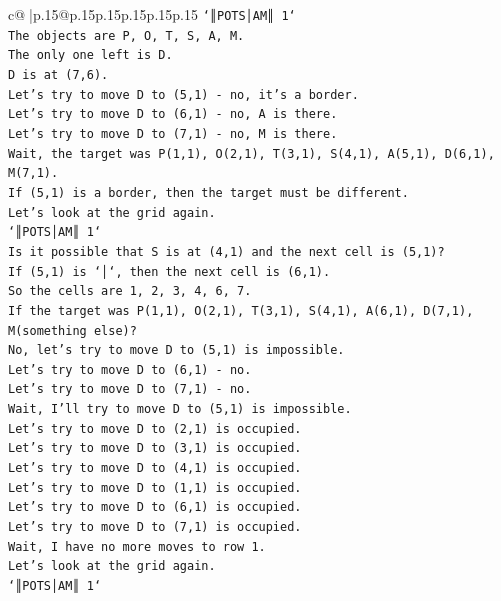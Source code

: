 \documentclass{article}
\begin{document}
{\begin{supertabular}{c@{$\;$}|p{.15\linewidth}@{}p{.15\linewidth}p{.15\linewidth}p{.15\linewidth}p{.15\linewidth}p{.15\linewidth}}
{{{\texttt{`║POTS│AM║ 1`} \\
\texttt{The objects are P, O, T, S, A, M.} \\
\texttt{The only one left is D.} \\
\texttt{D is at (7,6).} \\
\texttt{Let's try to move D to (5,1) {-} no, it's a border.} \\
\texttt{Let's try to move D to (6,1) {-} no, A is there.} \\
\texttt{Let's try to move D to (7,1) {-} no, M is there.} \\
\texttt{Wait, the target was P(1,1), O(2,1), T(3,1), S(4,1), A(5,1), D(6,1), M(7,1).} \\
\texttt{If (5,1) is a border, then the target must be different.} \\
\texttt{Let's look at the grid again.} \\
\texttt{`║POTS│AM║ 1`} \\
\texttt{Is it possible that S is at (4,1) and the next cell is (5,1)?} \\
\texttt{If (5,1) is `│`, then the next cell is (6,1).} \\
\texttt{So the cells are 1, 2, 3, 4, 6, 7.} \\
\texttt{If the target was P(1,1), O(2,1), T(3,1), S(4,1), A(6,1), D(7,1), M(something else)?} \\
\texttt{No, let's try to move D to (5,1) is impossible.} \\
\texttt{Let's try to move D to (6,1) {-} no.} \\
\texttt{Let's try to move D to (7,1) {-} no.} \\
\texttt{Wait, I'll try to move D to (5,1) is impossible.} \\
\texttt{Let's try to move D to (2,1) is occupied.} \\
\texttt{Let's try to move D to (3,1) is occupied.} \\
\texttt{Let's try to move D to (4,1) is occupied.} \\
\texttt{Let's try to move D to (1,1) is occupied.} \\
\texttt{Let's try to move D to (6,1) is occupied.} \\
\texttt{Let's try to move D to (7,1) is occupied.} \\
\texttt{Wait, I have no more moves to row 1.} \\
\texttt{Let's look at the grid again.} \\
\texttt{`║POTS│AM║ 1`} \\
}}}
\end{supertabular}}
\end{document}
